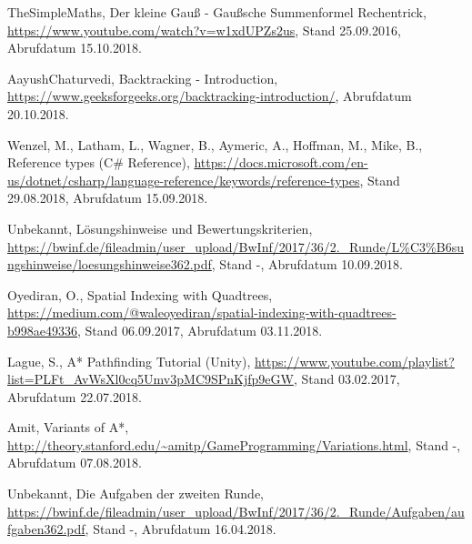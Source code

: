 \documentclass[a4paper,12pt]{article}
\begin{document}
\begin{thebibliography}{99}

      TheSimpleMaths,
      Der kleine Gauß - Gaußsche Summenformel Rechentrick,
      \url{https://www.youtube.com/watch?v=w1xdUPZs2us},
      Stand 25.09.2016,
      Abrufdatum 15.10.2018.
      
      AayushChaturvedi,
      Backtracking - Introduction,
      \url{https://www.geeksforgeeks.org/backtracking-introduction/},
      Abrufdatum 20.10.2018.
      
      Wenzel, M., Latham, L., Wagner, B., Aymeric, A., Hoffman, M., Mike, B.,
      Reference types (C\# Reference),
      \url{https://docs.microsoft.com/en-us/dotnet/csharp/language-reference/keywords/reference-types},
      Stand 29.08.2018,
      Abrufdatum 15.09.2018.
      
      Unbekannt,
      Lösungshinweise und Bewertungskriterien,
      \url{https://bwinf.de/fileadmin/user_upload/BwInf/2017/36/2._Runde/L\%C3\%B6sungshinweise/loesungshinweise362.pdf},
      Stand -,
      Abrufdatum 10.09.2018.
      
      Oyediran, O.,
      Spatial Indexing with Quadtrees,
      \url{https://medium.com/@waleoyediran/spatial-indexing-with-quadtrees-b998ae49336},
      Stand 06.09.2017,
      Abrufdatum 03.11.2018.
      
      Lague, S.,
      A* Pathfinding Tutorial (Unity),
      \url{https://www.youtube.com/playlist?list=PLFt_AvWsXl0cq5Umv3pMC9SPnKjfp9eGW},
      Stand 03.02.2017,
      Abrufdatum 22.07.2018.
      
      Amit,
      Variants of A*,
      \url{http://theory.stanford.edu/~amitp/GameProgramming/Variations.html},
      Stand -,
      Abrufdatum 07.08.2018.
      
      Unbekannt,
      Die Aufgaben der zweiten Runde,
      \url{https://bwinf.de/fileadmin/user_upload/BwInf/2017/36/2._Runde/Aufgaben/aufgaben362.pdf},
      Stand -,
      Abrufdatum 16.04.2018.

\end{thebibliography}

\endgroup

\end{document}
